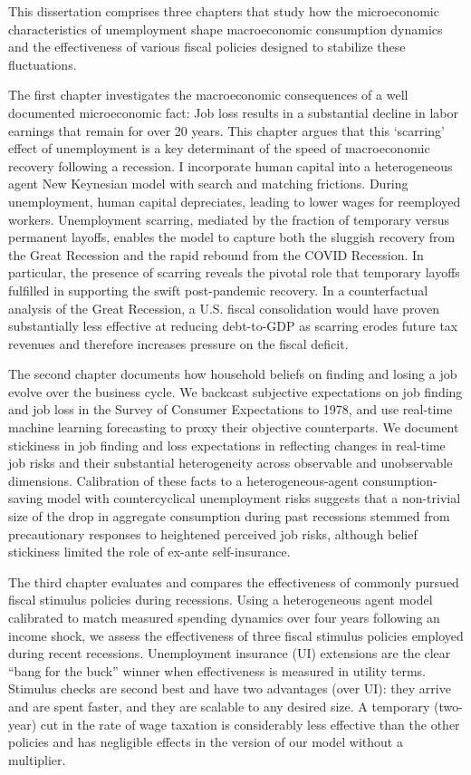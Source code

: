 %

This dissertation comprises three chapters that study how the microeconomic characteristics of unemployment shape macroeconomic consumption dynamics and the effectiveness of various fiscal policies designed to stabilize these fluctuations. 

The first chapter investigates the macroeconomic consequences of a well documented microeconomic fact: Job loss results in a substantial decline in labor earnings that remain for over 20 years. This chapter argues that this `scarring' effect of unemployment is a key determinant of the speed of macroeconomic recovery following a recession. I incorporate human capital into a heterogeneous agent New Keynesian model with search and matching frictions. During unemployment, human capital depreciates, leading to lower wages for reemployed workers. Unemployment scarring, mediated by the fraction of temporary versus permanent layoffs, enables the model to capture both the sluggish recovery from the Great Recession and the rapid rebound from the COVID Recession. In particular, the presence of scarring reveals the pivotal role that temporary layoffs fulfilled in supporting the swift post-pandemic recovery. In a counterfactual analysis of the Great Recession, a U.S. fiscal consolidation would have proven substantially less effective at reducing debt-to-GDP as scarring erodes future tax revenues and therefore increases pressure on the fiscal deficit.

The second chapter documents how household beliefs on finding and losing a job evolve over the business cycle. We backcast subjective expectations on job finding and job loss in the Survey of Consumer Expectations to 1978, and use real-time machine learning forecasting to proxy their objective counterparts. We document stickiness in job finding and loss expectations in reflecting changes in real-time job risks and their substantial heterogeneity across observable and unobservable dimensions. Calibration of these facts to a heterogeneous-agent consumption-saving model with countercyclical unemployment risks suggests that a non-trivial size of the drop in aggregate consumption during past recessions stemmed from precautionary responses to heightened perceived job risks, although belief stickiness limited the role of ex-ante self-insurance.

The third chapter evaluates and compares the effectiveness of commonly pursued fiscal stimulus policies during recessions. Using a heterogeneous agent model calibrated to match measured spending dynamics over four years following an income shock, we assess the effectiveness of three fiscal stimulus policies employed during recent recessions. Unemployment insurance (UI) extensions are the clear “bang for the buck” winner when effectiveness is measured in utility terms. Stimulus checks are second best and have two advantages (over UI): they arrive and are spent faster, and they are scalable to any desired size. A temporary (two-year) cut in the rate of wage taxation is considerably less effective than the other policies and has negligible effects in the version of our model without a multiplier.


